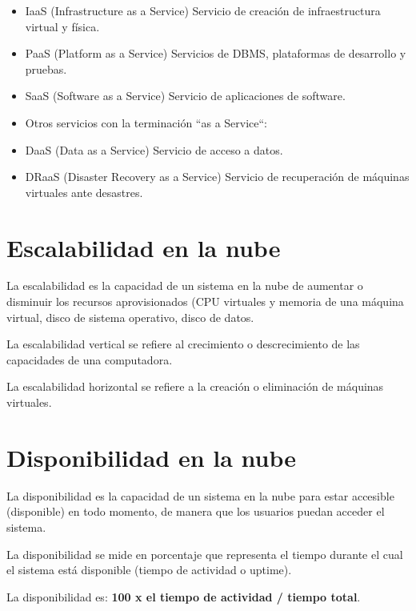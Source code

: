\begin{itemize}

\item IaaS (Infrastructure as a Service) Servicio de creación de infraestructura virtual y física.

\item PaaS (Platform as a Service) Servicios de DBMS, plataformas de desarrollo y pruebas.

\item SaaS (Software as a Service) Servicio de aplicaciones de software.

\item Otros servicios con la terminación ``as a Service``:

\item DaaS (Data as a Service) Servicio de acceso a datos.

\item DRaaS (Disaster Recovery as a Service) Servicio de recuperación de máquinas virtuales ante desastres.

\end{itemize}

\section{Escalabilidad en la nube}

La escalabilidad es la capacidad de un sistema en la nube de aumentar o disminuir los recursos aprovisionados (CPU virtuales y memoria de una máquina virtual, disco de sistema operativo, disco de datos.

La escalabilidad vertical se refiere al crecimiento o descrecimiento de las capacidades de una computadora.

La escalabilidad horizontal se refiere a la creación o eliminación de máquinas virtuales.

\section{Disponibilidad en la nube}

La disponibilidad es la capacidad de un sistema en la nube para estar accesible (disponible) en todo momento, de manera que los usuarios puedan acceder el sistema.

La disponibilidad se mide en porcentaje que representa el tiempo durante el cual el sistema está disponible (tiempo de actividad o uptime).

La disponibilidad es: \textbf{100 x el tiempo de actividad / tiempo total}.


